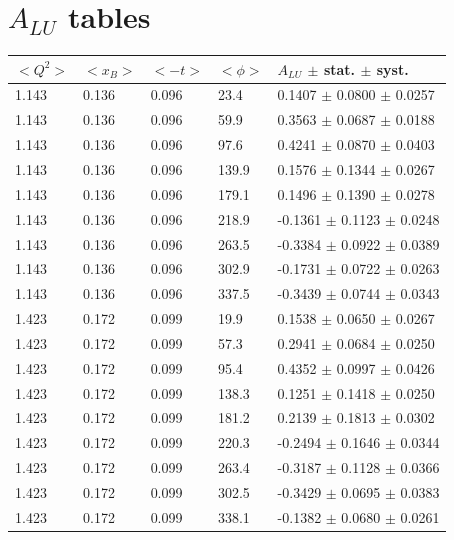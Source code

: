 \chapter{$A_{LU}$ tables}
\begin{table}[!h]
   \begin{center}
      \begin{tabular}{||l|l|l|l|l||}
         \hline
 $<Q^{2}>$ & $<x_{B}>$ & $<-t>$ & $<\phi>$ & $A_{LU}$ $\pm$ stat. $\pm$ syst.\\
         \hline
  1.143 & 0.136 & 0.096 &  23.4  &  0.1407   $\pm$ 0.0800   $\pm$  0.0257 \\
  1.143 & 0.136 & 0.096 &  59.9  &  0.3563   $\pm$ 0.0687   $\pm$  0.0188 \\
  1.143 & 0.136 & 0.096 &  97.6  &  0.4241   $\pm$ 0.0870   $\pm$  0.0403 \\
  1.143 & 0.136 & 0.096 &  139.9 &  0.1576   $\pm$ 0.1344   $\pm$  0.0267 \\
  1.143 & 0.136 & 0.096 &  179.1 &  0.1496   $\pm$ 0.1390   $\pm$  0.0278 \\
  1.143 & 0.136 & 0.096 &  218.9 & -0.1361   $\pm$ 0.1123   $\pm$  0.0248 \\
  1.143 & 0.136 & 0.096 &  263.5 & -0.3384   $\pm$ 0.0922   $\pm$  0.0389 \\
  1.143 & 0.136 & 0.096 &  302.9 & -0.1731   $\pm$ 0.0722   $\pm$  0.0263 \\
  1.143 & 0.136 & 0.096 &  337.5 & -0.3439   $\pm$ 0.0744   $\pm$  0.0343 \\
  \hline                                                           
  1.423 & 0.172 & 0.099 &  19.9  &  0.1538   $\pm$ 0.0650   $\pm$  0.0267 \\
  1.423 & 0.172 & 0.099 &  57.3  &  0.2941   $\pm$ 0.0684   $\pm$  0.0250 \\
  1.423 & 0.172 & 0.099 &  95.4  &  0.4352   $\pm$ 0.0997   $\pm$  0.0426 \\
  1.423 & 0.172 & 0.099 &  138.3 &  0.1251   $\pm$ 0.1418   $\pm$  0.0250 \\
  1.423 & 0.172 & 0.099 &  181.2 &  0.2139   $\pm$ 0.1813   $\pm$  0.0302 \\
  1.423 & 0.172 & 0.099 &  220.3 & -0.2494   $\pm$ 0.1646   $\pm$  0.0344 \\
  1.423 & 0.172 & 0.099 &  263.4 & -0.3187   $\pm$ 0.1128   $\pm$  0.0366 \\
  1.423 & 0.172 & 0.099 &  302.5 & -0.3429   $\pm$ 0.0695   $\pm$  0.0383 \\
  1.423 & 0.172 & 0.099 &  338.1 & -0.1382   $\pm$ 0.0680   $\pm$  0.0261 \\

\end{tabular}
\end{center}
\end{table}
